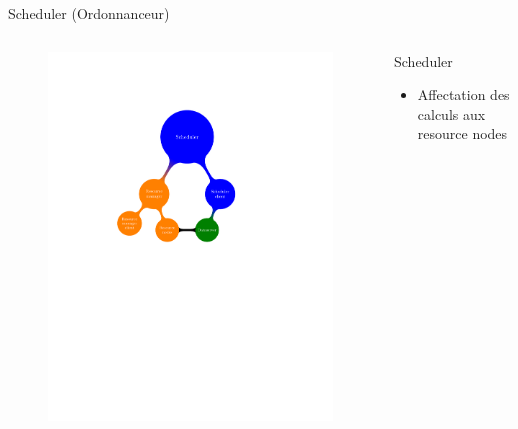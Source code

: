 \documentclass{beamer}
\begin{document}
\begin{frame}{Scheduler (Ordonnanceur)}
	\begin{columns}
	\begin{column}[l]{0.5\linewidth}
        \begin{figure}
            \centering
            \includegraphics[trim=5.5cm 14.3cm 2cm 6.3cm,scale=0.69]{netmap_abs.pdf}
        \end{figure}
	\end{column}
	\begin{column}[r]{0.5\linewidth}
        \begin{block}{Scheduler}
            \begin{itemize}
            \item Affectation des calculs aux resource nodes

\end{itemize}
\end{block}
\end{column}
\end{columns}
\end{frame}
\end{document}
